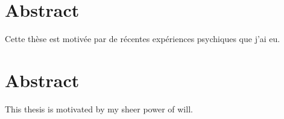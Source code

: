 \Clear
\chapter*{Abstract}
\label{cha:abstract_fr}

Cette thèse est motivée par de récentes expériences psychiques que j'ai eu.

\Clear
\chapter*{Abstract}
\label{cha:abstract}

This thesis is motivated by my sheer power of will.

